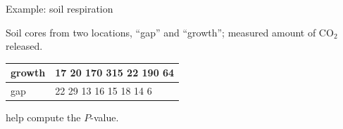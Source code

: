 \begin{frame}{Example: soil respiration}

  Soil cores from two locations, ``gap'' and ``growth'';
  measured amount of CO${}_2$ released.

  \begin{center}
  \begin{tabular}{l|p{2.5in}}
    growth & 17 \hspace{.25em} 20 \hspace{.25em} 170 \hspace{.25em} 315 \hspace{.25em} 22 \hspace{.25em} 190 \hspace{.25em} 64 \\
    \hline
    gap & 22 \hspace{.25em} 29 \hspace{.25em} 13 \hspace{.25em} 16 \hspace{.25em} 15 \hspace{.25em} 18 \hspace{.25em} 14 \hspace{.25em} 6 \\
  \end{tabular}

    \vspace{2em}

     help compute the $P$-value.

    \vspace{2em}


  \end{center}

\end{frame}

